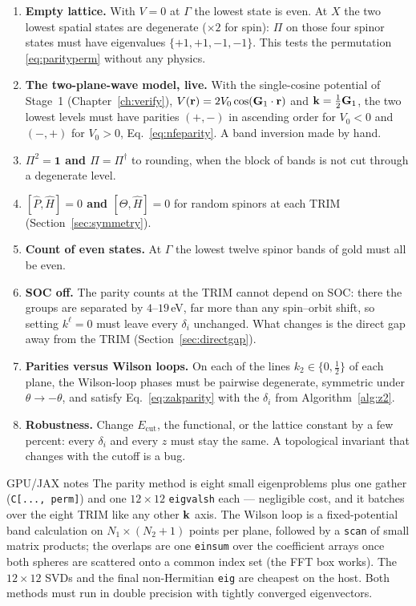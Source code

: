\begin{enumerate}[leftmargin=2em]
\item \textbf{Empty lattice.} With $V = 0$ at $\Gamma$ the lowest state is
even. At $X$ the two lowest spatial states are degenerate ($\times2$ for
spin): $\Pi$ on those four spinor states must have eigenvalues
$\{+1,+1,-1,-1\}$. This tests the permutation \eqref{eq:parityperm}
without any physics.
\item \textbf{The two-plane-wave model, live.} With the single-cosine
potential of Stage~1 (Chapter~\ref{ch:verify}),
$V(\mathbf{r}) = 2V_0\cos(\mathbf{G}_1\cdot\mathbf{r})$ and $\mathbf{k} = \tfrac12\mathbf{G}_1$, the two
lowest levels must have parities $(+,-)$ in ascending order for $V_0<0$
and $(-,+)$ for $V_0>0$, Eq.~\eqref{eq:nfeparity}. A band inversion made
by hand.
\item \textbf{$\Pi^2 = \mathbf 1$ and $\Pi = \Pi^\dagger$} to rounding,
when the block of bands is not cut through a degenerate level.
\item \textbf{$[\hat P, \hat H] = 0$ and $[\Theta,\hat H]=0$} for random
spinors at each TRIM (Section~\ref{sec:symmetry}).
\item \textbf{Count of even states.} At $\Gamma$ the lowest twelve spinor
bands of gold must all be even.
\item \textbf{SOC off.} The parity counts at the TRIM cannot depend on
SOC: there the groups are separated by $4$--$19$\,eV, far more than any
spin--orbit shift, so setting $k^\ell = 0$ must leave every $\delta_i$
unchanged. What changes is the direct gap away from the TRIM
(Section~\ref{sec:directgap}).
\item \textbf{Parities versus Wilson loops.} On each of the lines
$k_2 \in\{0,\tfrac12\}$ of each plane, the Wilson-loop phases must be
pairwise degenerate, symmetric under $\theta\to-\theta$, and satisfy
Eq.~\eqref{eq:zakparity} with the $\delta_i$ from Algorithm~\ref{alg:z2}.
\item \textbf{Robustness.} Change $E_{\mathrm{cut}}$, the functional, or
the lattice constant by a few percent: every $\delta_i$ and every $z$ must
stay the same. A topological invariant that changes with the cutoff is a
bug.
\end{enumerate}

\begin{gpubox}{GPU/JAX notes}
The parity method is eight small eigenproblems plus one gather
(\texttt{C[..., perm]}) and one $12\times12$ \texttt{eigvalsh} each ---
negligible cost, and it batches over the eight TRIM like any other
$\mathbf{k}$ axis. The Wilson loop is a fixed-potential band calculation on
$N_1 \times (N_2{+}1)$ points per plane, followed by a \texttt{scan} of
small matrix products; the overlaps are one \texttt{einsum} over the
coefficient arrays once both spheres are scattered onto a common index
set (the FFT box works). The $12\times12$ SVDs and the final
non-Hermitian \texttt{eig} are cheapest on the host. Both methods must run
in double precision with tightly converged eigenvectors.
\end{gpubox}

